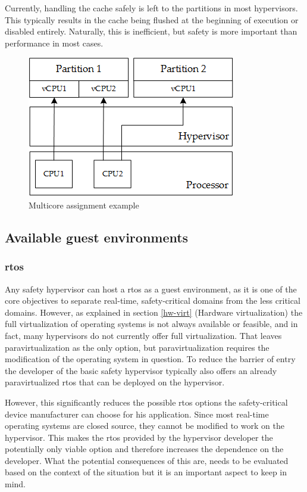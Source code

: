 Currently, handling the cache safely is left to the partitions in most hypervisors. This typically results in the cache being flushed at the beginning of execution or disabled entirely. Naturally, this is inefficient, but safety is more important than performance in most cases.

\begin{figure}[hb!]
\centering
\includegraphics[scale=0.75]{Figures/multicore.png}
\decoRule
\caption{Multicore assignment example}
\label{fig:multicore}
\end{figure}

\subsection{Available guest environments}
\subsubsection{\acrshort{rtos}}
Any safety hypervisor can host a \acrlong{rtos} as a guest environment, as it is one of the core objectives to separate real-time, safety-critical domains from the less critical domains. However, as explained in section \ref{hw-virt} (Hardware virtualization) the full virtualization of operating systems is not always available or feasible, and in fact, many hypervisors do not currently offer full virtualization. That leaves paravirtualization as the only option, but paravirtualization requires the modification of the operating system in question. To reduce the barrier of entry the developer of the basic safety hypervisor typically also offers an already paravirtualized \acrshort{rtos} that can be deployed on the hypervisor. 

However, this significantly reduces the possible \acrshort{rtos} options the safety-critical device manufacturer can choose for his application. Since most real-time operating systems are closed source, they cannot be modified to work on the hypervisor. This makes the \acrshort{rtos} provided by the hypervisor developer the potentially only viable option and therefore increases the dependence on the developer. What the potential consequences of this are, needs to be evaluated based on the context of the situation but it is an important aspect to keep in mind.

